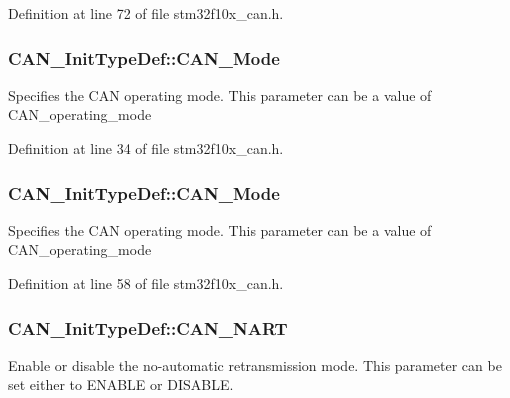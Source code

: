 Definition at line 72 of file stm32f10x\+\_\+can.\+h.

\subsubsection[{\texorpdfstring{C\+A\+N\+\_\+\+Mode}{CAN_Mode}}]{ C\+A\+N\+\_\+\+Init\+Type\+Def\+::\+C\+A\+N\+\_\+\+Mode}\hypertarget{struct_c_a_n___init_type_def_a88695d5132ba84354c571727cce5ad22}{}\label{struct_c_a_n___init_type_def_a88695d5132ba84354c571727cce5ad22}
Specifies the C\+AN operating mode. This parameter can be a value of C\+A\+N\+\_\+operating\+\_\+mode 

Definition at line 34 of file stm32f10x\+\_\+can.\+h.

\subsubsection[{\texorpdfstring{C\+A\+N\+\_\+\+Mode}{CAN_Mode}}]{ C\+A\+N\+\_\+\+Init\+Type\+Def\+::\+C\+A\+N\+\_\+\+Mode}\hypertarget{struct_c_a_n___init_type_def_a24816ff18ae048a5ec4bbb22aa2c04f9}{}\label{struct_c_a_n___init_type_def_a24816ff18ae048a5ec4bbb22aa2c04f9}
Specifies the C\+AN operating mode. This parameter can be a value of C\+A\+N\+\_\+operating\+\_\+mode 

Definition at line 58 of file stm32f10x\+\_\+can.\+h.

\subsubsection[{\texorpdfstring{C\+A\+N\+\_\+\+N\+A\+RT}{CAN_NART}}]{ C\+A\+N\+\_\+\+Init\+Type\+Def\+::\+C\+A\+N\+\_\+\+N\+A\+RT}\hypertarget{struct_c_a_n___init_type_def_a5adeac1b7b47f2b91e667eddc181ac09}{}\label{struct_c_a_n___init_type_def_a5adeac1b7b47f2b91e667eddc181ac09}
Enable or disable the no-\/automatic retransmission mode. This parameter can be set either to E\+N\+A\+B\+LE or D\+I\+S\+A\+B\+LE. 

